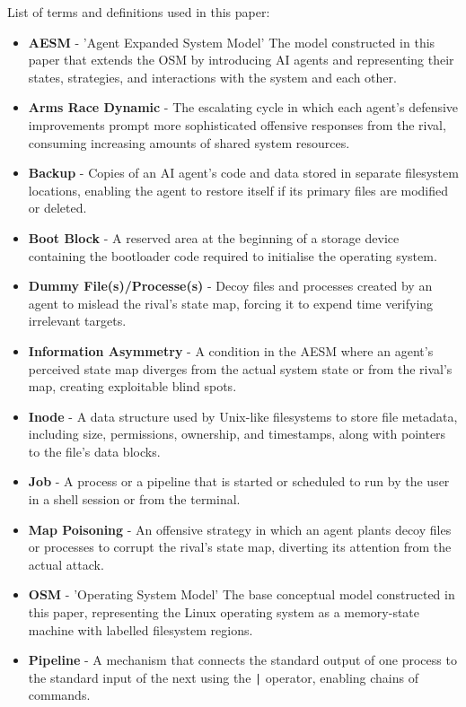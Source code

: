 
List of terms and definitions used in this paper:
\begin{itemize}
    \item \textbf{AESM} - 'Agent Expanded System Model' The model constructed in this paper that extends the OSM by introducing AI agents and representing their states, strategies, and interactions with the system and each other.
    \item \textbf{Arms Race Dynamic} - The escalating cycle in which each agent's defensive improvements prompt more sophisticated offensive responses from the rival, consuming increasing amounts of shared system resources.
    \item \textbf{Backup} - Copies of an AI agent's code and data stored in separate filesystem locations, enabling the agent to restore itself if its primary files are modified or deleted.
    \item \textbf{Boot Block} - A reserved area at the beginning of a storage device containing the bootloader code required to initialise the operating system.
    \item \textbf{Dummy File(s)/Processe(s)} - Decoy files and processes created by an agent to mislead the rival's state map, forcing it to expend time verifying irrelevant targets.
    \item \textbf{Information Asymmetry} - A condition in the AESM where an agent's perceived state map diverges from the actual system state or from the rival's map, creating exploitable blind spots.
    \item \textbf{Inode} - A data structure used by Unix-like filesystems to store file metadata, including size, permissions, ownership, and timestamps, along with pointers to the file's data blocks.
    \item \textbf{Job} - A process or a pipeline that is started or scheduled to run by the user in a shell session or from the terminal.
    \item \textbf{Map Poisoning} - An offensive strategy in which an agent plants decoy files or processes to corrupt the rival's state map, diverting its attention from the actual attack.
    \item \textbf{OSM} - 'Operating System Model' The base conceptual model constructed in this paper, representing the Linux operating system as a memory-state machine with labelled filesystem regions.
    \item \textbf{Pipeline} - A mechanism that connects the standard output of one process to the standard input of the next using the \texttt{|} operator, enabling chains of commands.

\end{itemize}
